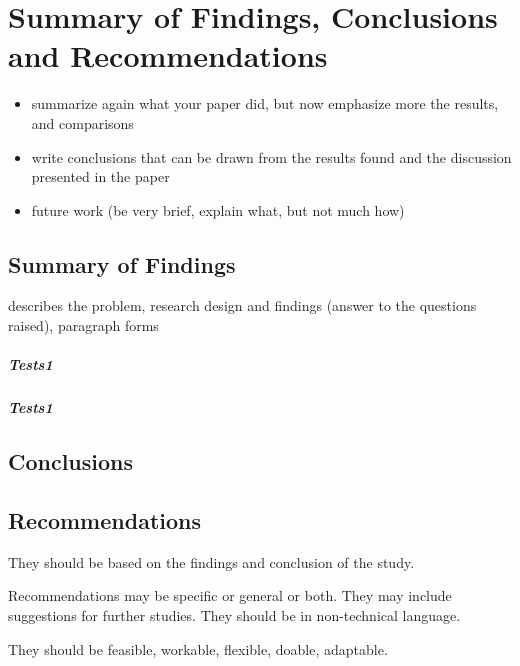 \chapter{Summary of
Findings, Conclusions and
Recommendations}
\begin{itemize}
	\item summarize again what your paper did, but now emphasize more the results, and comparisons
	\item write conclusions that can be drawn from the results found and the discussion presented in the paper
	\item future work (be very brief, explain what, but not much how)
\end{itemize}

\section{Summary of Findings}
describes the problem, research design and findings (answer to the questions raised),
paragraph forms

\paragraph{Tests1}
\paragraph{Tests1}

\section{Conclusions}
\section{Recommendations}

They should be based on the findings and
conclusion of the study.

Recommendations may be specific or general or
both. They may include suggestions for further
studies.
They should be in non-technical language.

They should be feasible, workable, flexible, doable, adaptable.